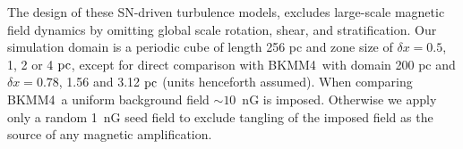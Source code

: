 \documentclass[preprint2]{aastex63}
\newcommand\pc{~ {\rm pc}}
\newcommand\dx{ {\delta x}}
\newcommand\BKM{{\sf BKMM4}}
\newcommand{\fg}[1]{\textcolor{midgreen}{#1}}
\begin{document}
 \fg{The design of these} SN-driven turbulence models, excludes large-scale
 magnetic field dynamics by \fg{omitting global scale} rotation, shear, and
 stratification.
 Our simulation domain is a periodic cube of length 256 pc and zone size
 of $\dx=0.5$, 1, 2 or 4$\pc$\fg{, except for direct comparison with
 \BKM\  with domain 200 pc and $\dx=0.78$, 1.56 and 3.12$\pc$ (units henceforth
 assumed)}.
 \fg{When comparing \BKM\ a uniform background field $\sim10$~nG is imposed.
 Otherwise we apply only a} random 1~nG seed field \fg{to} exclude tangling of
 \fg{the} imposed field as the source of any magnetic amplification.
\end{document}
